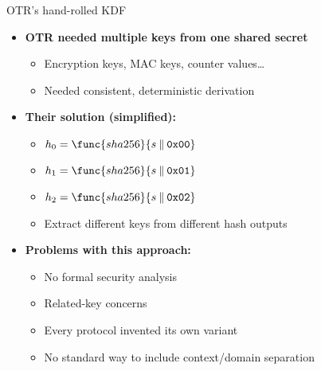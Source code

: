 \documentclass[aspectratio=169, lualatex, handout]{beamer}
\begin{document}
\begin{frame}{OTR's hand-rolled KDF}
	\begin{itemize}
		\item \textbf{OTR needed multiple keys from one shared secret}
		      \begin{itemize}
			      \item Encryption keys, MAC keys, counter values\ldots
			      \item Needed consistent, deterministic derivation
		      \end{itemize}
		\item \textbf{Their solution (simplified):}
		      \begin{itemize}
			      \item $h_0 = \func{sha256}{s \mathbin{\|} \texttt{0x00}}$
			      \item $h_1 = \func{sha256}{s \mathbin{\|} \texttt{0x01}}$
			      \item $h_2 = \func{sha256}{s \mathbin{\|} \texttt{0x02}}$
			      \item Extract different keys from different hash outputs
		      \end{itemize}
		\item \textbf{Problems with this approach:}
		      \begin{itemize}
			      \item No formal security analysis
			      \item Related-key concerns
			      \item Every protocol invented its own variant
			      \item No standard way to include context/domain separation
		      \end{itemize}
	\end{itemize}
\end{frame}
\end{document}
